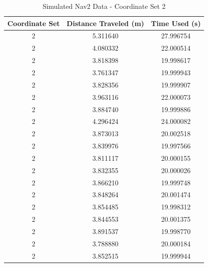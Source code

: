 \documentclass[%
paper=A4,               %
twoside=true,           %
openright,              %
11pt,                   %
bibliography=totoc,     %
titlepage=on,           %
DIV=12,                 %
BCOR=1.5cm,             %
parskip=half,            %
final
]{scrreprt}
\begin{document}
	
	\begin{table}[h!]
		\centering
		\begin{tabular}{|c|c|c|}
			\hline
			Coordinate Set & Distance Traveled (m) & Time Used (s) \\
			\hline
			2 & 5.311640 & 27.996754 \\
			2 & 4.080332 & 22.000514 \\
			2 & 3.818398 & 19.998617 \\
			2 & 3.761347 & 19.999943 \\
			2 & 3.828356 & 19.999907 \\
			2 & 3.963116 & 22.000073 \\
			2 & 3.884740 & 19.999886 \\
			2 & 4.296424 & 24.000082 \\
			2 & 3.873013 & 20.002518 \\
			2 & 3.839976 & 19.997566 \\
			2 & 3.811117 & 20.000155 \\
			2 & 3.832355 & 20.000026 \\
			2 & 3.866210 & 19.999748 \\
			2 & 3.848264 & 20.001474 \\
			2 & 3.854485 & 19.998312 \\
			2 & 3.844553 & 20.001375 \\
			2 & 3.891537 & 19.998770 \\
			2 & 3.788880 & 20.000184 \\
			2 & 3.852515 & 19.999944 \\
			\hline
		\end{tabular}
		\caption{Simulated Nav2 Data - Coordinate Set 2}
		\label{tab:3}
	\end{table}
	
\end{document}
